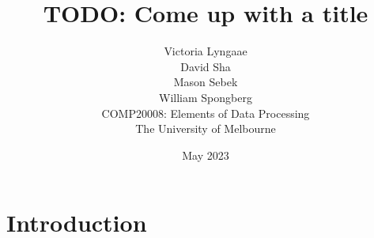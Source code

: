 \documentclass[11pt]{article}
\title{TODO: Come up with a title}
\author{
    Victoria Lyngaae\\
\AND
    David Sha\\
\AND
    Mason Sebek\\
\AND
    William Spongberg\\
\AND
\AND
\AND
	COMP20008: Elements of Data Processing\\
\AND
	The University of Melbourne\\
}
\date{May 2023}
\begin{document}
\maketitle

\newpage
\tableofcontents
\thispagestyle{empty}

\newpage
\setcounter{page}{1}
\section{Introduction}
\end{document}
